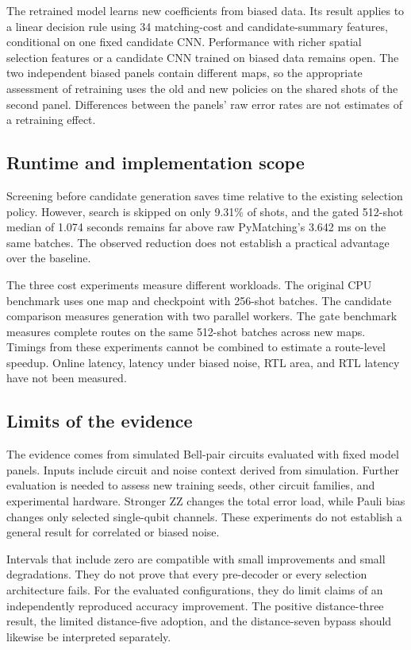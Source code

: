 \documentclass[aps,prd,12pt,twocolumn,superscriptaddress,floatfix]{revtex4-2}
\begin{document}
The retrained model learns new coefficients from biased data. Its result applies to a linear decision rule using 34 matching-cost and candidate-summary features, conditional on one fixed candidate CNN. Performance with richer spatial selection features or a candidate CNN trained on biased data remains open. The two independent biased panels contain different maps, so the appropriate assessment of retraining uses the old and new policies on the shared shots of the second panel. Differences between the panels' raw error rates are not estimates of a retraining effect.

\subsection{Runtime and implementation scope}

Screening before candidate generation saves time relative to the existing selection policy. However, search is skipped on only 9.31\% of shots, and the gated 512-shot median of 1.074 seconds remains far above raw PyMatching's 3.642 ms on the same batches. The observed reduction does not establish a practical advantage over the baseline.

The three cost experiments measure different workloads. The original CPU benchmark uses one map and checkpoint with 256-shot batches. The candidate comparison measures generation with two parallel workers. The gate benchmark measures complete routes on the same 512-shot batches across new maps. Timings from these experiments cannot be combined to estimate a route-level speedup. Online latency, latency under biased noise, RTL area, and RTL latency have not been measured.

\subsection{Limits of the evidence}

The evidence comes from simulated Bell-pair circuits evaluated with fixed model panels. Inputs include circuit and noise context derived from simulation. Further evaluation is needed to assess new training seeds, other circuit families, and experimental hardware. Stronger ZZ changes the total error load, while Pauli bias changes only selected single-qubit channels. These experiments do not establish a general result for correlated or biased noise.

Intervals that include zero are compatible with small improvements and small degradations. They do not prove that every pre-decoder or every selection architecture fails. For the evaluated configurations, they do limit claims of an independently reproduced accuracy improvement. The positive distance-three result, the limited distance-five adoption, and the distance-seven bypass should likewise be interpreted separately.
\end{document}
